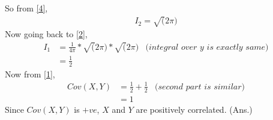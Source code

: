 \documentclass{article}
\theoremstyle{remark}
\begin{document}
So from \eqref{4},
\begin{align*}
    I_2 = \sqrt(2\pi)
\end{align*}
Now going back to \eqref{2},
\begin{align*}
    I_1 &= \frac{1}{4\pi}*\sqrt(2\pi)*\sqrt(2\pi) &\textit{(integral over $y$ is exactly same)}\\
    &= \frac{1}{2}
\end{align*}
Now from \eqref{1},
\begin{align*}
    Cov(X,Y) &= \frac{1}{2} + \frac{1}{2} &\textit{(second part is similar)}\\
    &=1
\end{align*}
Since $Cov(X,Y)$ is $+ve$, $X$ and $Y$ are positively correlated. (Ans.)
\end{document}
